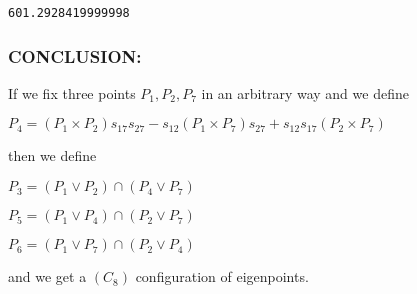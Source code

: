 \documentclass[11pt]{article}
\begin{document}
    \begin{Verbatim}[commandchars=\\\{\}]
601.2928419999998
    \end{Verbatim}

    \hypertarget{conclusion}{%
\subsubsection{CONCLUSION:}\label{conclusion}}

If we fix three points \(P_1, P_2, P_7\) in an arbitrary way and we
define

\(P_4 = (P_1 \times P_2)s_{17}s_{27} -  s_{12}(P_1 \times P_7)s_{27} + s_{12}s_{17}(P_2 \times P_7)\)

then we define

\(P_3 = (P_1 \vee P_2) \cap (P_4 \vee P_7)\)

\(P_5 = (P_1 \vee P_4) \cap (P_2 \vee P_7)\)

\(P_6 = (P_1 \vee P_7) \cap (P_2 \vee P_4)\)

and we get a \((C_8)\) configuration of eigenpoints.


    
    
    
\end{document}
